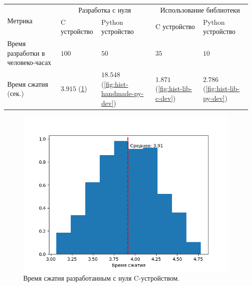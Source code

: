 \begin{longtable}{| p{3cm} | p{3cm} | p{3cm} | p{3cm} | p{3cm} |}
    \hline
        \multirow{2}{*}{Метрика} &
        \multicolumn{2}{c|}{Разработка с нуля} &
        \multicolumn{2}{c|}{Использование библиотеки} \\
    \cline{2-5} &
        C устройство &
        Python устройство &
        C устройство &
        Python устройство \\
    \hline
        Время разработки в человеко-часах &
        $100$ &
        $50$ &
        $35$ &
        $10$ \\
    \hline
        Время сжатия (сек.)&
        $3.915$  (\cref{fig:hist-handmade-c-dev}) &
        $18.548$ (\cref{fig:hist-handmade-py-dev}) &
        $1.871$  (\cref{fig:hist-lib-c-dev}) &
        $2.786$  (\cref{fig:hist-lib-py-dev}) \\
    \hline
\end{longtable}

\begin{figure}[!htbp]
    \centering
    \begin{adjustbox}{max totalsize={0.8\textwidth}{\textheight}}
        \includegraphics{images/hist-handmade-c-dev.png}
    \end{adjustbox}
    \caption{Время сжатия разработанным с нуля C-устройством.}\label{fig:hist-handmade-c-dev}
\end{figure}


